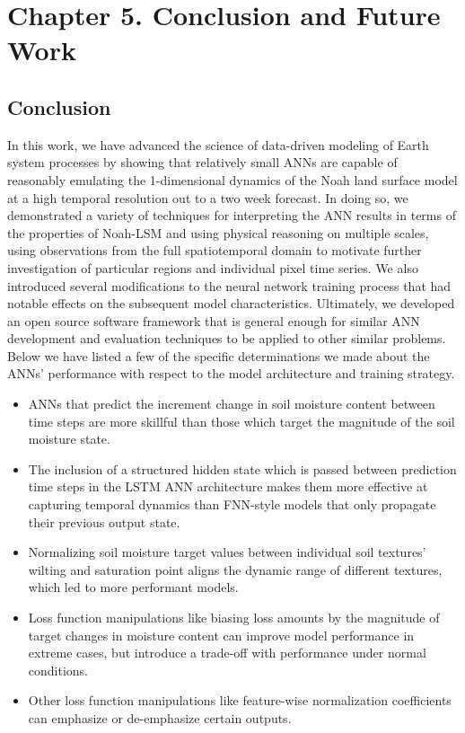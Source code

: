 \chapter{Chapter 5. Conclusion and Future Work}

\section{Conclusion}

In this work, we have advanced the science of data-driven modeling of Earth system processes by showing that relatively small ANNs are capable of reasonably emulating the 1-dimensional dynamics of the Noah land surface model at a high temporal resolution out to a two week forecast. In doing so, we demonstrated a variety of techniques for interpreting the ANN results in terms of the properties of Noah-LSM and using physical reasoning on multiple scales, using observations from the full spatiotemporal domain to motivate further investigation of particular regions and individual pixel time series. We also introduced several modifications to the neural network training process that had notable effects on the subsequent model characteristics. Ultimately, we developed an open source software framework that is general enough for similar ANN development and evaluation techniques to be applied to other similar problems. Below we have listed a few of the specific determinations we made about the ANNs' performance with respect to the model architecture and training strategy.

\begin{itemize}
    \item{ANNs that predict the increment change in soil moisture content between time steps are more skillful than those which target the magnitude of the soil moisture state.}
    \item{The inclusion of a structured hidden state which is passed between prediction time steps in the LSTM ANN architecture makes them more effective at capturing temporal dynamics than FNN-style models that only propagate their previous output state.}
    \item{Normalizing soil moisture target values between individual soil textures' wilting and saturation point aligns the dynamic range of different textures, which led to more performant models.}
    \item{Loss function manipulations like biasing loss amounts by the magnitude of target changes in moisture content can improve model performance in extreme cases, but introduce a trade-off with performance under normal conditions.}
    \item{Other loss function manipulations like feature-wise normalization coefficients can emphasize or de-emphasize certain outputs.}
\end{itemize}

